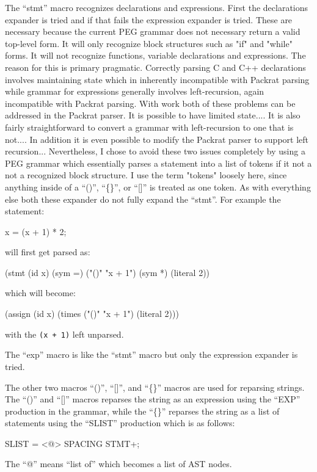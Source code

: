 \documentclass[12pt,english,letterpaper]{article}
\begin{document}
The ``stmt'' macro recognizes declarations and expressions.  First the
declarations expander is tried and if that fails the expression
expander is tried.  These are necessary because the current PEG
grammar does not necessary return a valid top-level form.  It will
only recognize block structures such as "if" and "while" forms.  It
will not recognize functions, variable declarations and expressions.
The reason for this is primary pragmatic.  Correctly parsing C and C++
declarations involves maintaining state which in inherently
incompatible with Packrat parsing while grammar for expressions
generally involves left-recursion, again incompatible with Packrat
parsing.  With work both of these problems can be addressed in the
Packrat parser.  It is possible to have limited state....  It is also
fairly straightforward to convert a grammar with left-recursion to one
that is not....  In addition it is even possible to modify the Packrat
parser to support left recursion...  Nevertheless, I chose to avoid
these two issues completely by using a PEG grammar which essentially
parses a statement into a list of tokens if it not a not a recognized
block structure.  I use the term "tokens" loosely here, since anything
inside of a ``()'', ``\{\}'', or ``[]'' is treated as one token.  As with
everything else both these expander do not fully expand the ``stmt''.
For example the statement:
\begin{code}
x = (x + 1) * 2;
\end{code}
will first get parsed as:
\begin{code}
(stmt (id x) (sym =) ("()" "x + 1") (sym *) (literal 2))
\end{code}
which will become:
\begin{code}
(assign (id x) (times ("()" "x + 1") (literal 2)))
\end{code}
with the \verb/(x + 1)/ left unparsed.

The ``exp'' macro is like the ``stmt'' macro but only the expression
expander is tried.

The other two macros ``()'', ``[]'', and ``\{\}'' macros are used for
reparsing strings.  The ``()'' and ``[]'' macros reparses the string
as an expression using the ``EXP'' production in the grammar, while
the ``\{\}'' reparses the string as a list of statements using the
``SLIST'' production which is as follows:
\begin{code}
SLIST = <@> SPACING {STMT}+;
\end{code}
The ``@'' means ``list of'' which becomes a list of AST nodes. 
\end{document}
